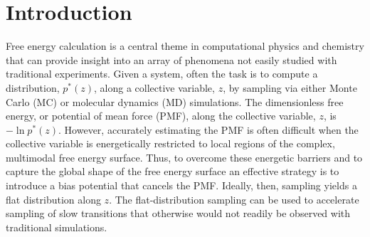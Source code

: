 \documentclass[reprint, superscriptaddress, floatfix]{revtex4-1}
\begin{document}
\maketitle



\section{Introduction}



Free energy calculation\cite{frenkel, newman} is a central theme
in computational physics and chemistry
that can provide insight into an array of phenomena not easily studied
with traditional experiments.
%
Given a system,
often the task is to compute
a distribution, $p^*(z)$,
along a collective variable, $z$, by sampling via either Monte Carlo\cite{
  frenkel, newman, landau_binder} (MC)
or molecular dynamics\cite{frenkel, karplus2002} (MD) simulations.
%
The dimensionless free energy, or potential of mean force (PMF),
along the collective variable, $z$,
is $-\ln p^*(z)$.
%
However, accurately estimating the PMF is often difficult
when the collective variable is energetically restricted to local regions
of the complex, multimodal free energy surface.
%
Thus,
to overcome these energetic barriers and
to capture the global shape of the free energy surface
an effective strategy is to introduce a bias potential that
cancels the PMF.
%
Ideally, then, sampling yields a flat distribution
along $z$\cite{mezei1987, berg1992, *lee1993,
wang2001, *wang2001pre,
huber1994,
*laio2002, *laio2008, *barducci2011, *sutto2012}.
%
The flat-distribution sampling can be used to accelerate
sampling of slow transitions that otherwise would not readily
be observed with traditional simulations.
%
\end{document}
